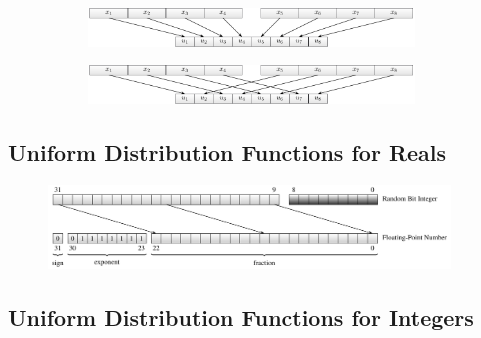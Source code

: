 \documentclass{stdlocal}
\begin{document}
    \begin{figure}
      \center
      \begin{subfigure}[b]{\textwidth}
        \center
        \includegraphics[width=0.95\textwidth]{figures/msws_merge.pdf}
      \end{subfigure}

      \begin{subfigure}[b]{\textwidth}
        \center
        \includegraphics[width=0.95\textwidth]{figures/msws_merge2.pdf}
      \end{subfigure}
      \caption[MSWS Vector Merge Scheme]{}
      \label{fig:msws-vector-merge-scheme}
    \end{figure}


  \subsection{Uniform Distribution Functions for Reals} %
  \label{sub:uniform_real_distribution}

    \begin{figure}
      \center
      \includegraphics[width=0.95\textwidth]{figures/uniform_implementation_scheme.pdf}
      \caption[Real Uniform Distribution Function Implementation Scheme]{}
      \label{fig:real-uniform-implementation-scheme}
    \end{figure}

  \subsection{Uniform Distribution Functions for Integers} %
  \label{sub:uniform_distribution_functions_for_integers}

\end{document}
